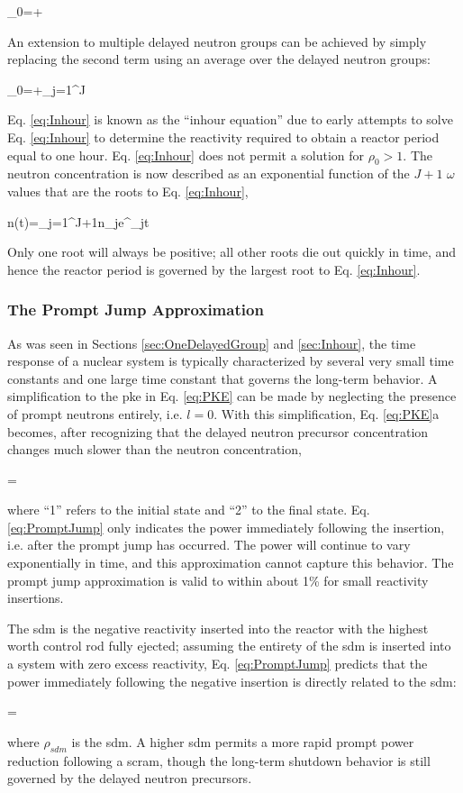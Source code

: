 \beq
\rho_0=+
\eeq

An extension to multiple delayed neutron groups can be achieved by simply replacing the second term using an average over the delayed neutron groups:

\beq
\label{eq:Inhour}
\rho_0=+\sum_{j=1}^J
\eeq

Eq. \eqref{eq:Inhour} is known as the ``inhour equation'' due to early attempts to solve Eq. \eqref{eq:Inhour} to determine the reactivity required to obtain a reactor period equal to one hour. Eq. \eqref{eq:Inhour} does not permit a solution for \(\rho_0>1\). The neutron concentration is now described as an exponential function of the \(J+1\) \(\omega\) values that are the roots to Eq. \eqref{eq:Inhour},

\beq
n(t)=\sum_{j=1}^{J+1}n_je^{\omega_jt}
\eeq

Only one root will always be positive; all other roots die out quickly in time, and hence the reactor period is governed by the largest root to Eq. \eqref{eq:Inhour}.

\subsubsection{The Prompt Jump Approximation}

As was seen in Sections \ref{sec:OneDelayedGroup} and \ref{sec:Inhour}, the time response of a nuclear system is typically characterized by several very small time constants and one large time constant that governs the long-term behavior. A simplification to the \gls{pke} in Eq. \eqref{eq:PKE} can be made by neglecting the presence of prompt neutrons entirely, i.e. \(l=0\). With this simplification, Eq. \eqref{eq:PKE}a becomes, after recognizing that the delayed neutron precursor concentration changes much slower than the neutron concentration,

\beq
\label{eq:PromptJump}
=
\eeq

where ``1'' refers to the initial state and ``2'' to the final state. Eq. \eqref{eq:PromptJump} only indicates the power immediately following the insertion, i.e. after the prompt jump has occurred. The power will continue to vary exponentially in time, and this approximation cannot capture this behavior. The prompt jump approximation is valid to within about 1\% for small reactivity insertions.

The \gls{sdm} is the negative reactivity inserted into the reactor with the highest worth control rod fully ejected; assuming the entirety of the \gls{sdm} is inserted into a system with zero excess reactivity, Eq. \eqref{eq:PromptJump} predicts that the power immediately following the negative insertion is directly related to the \gls{sdm}:

\beq
{}=
\eeq

where \(\rho_{sdm}\) is the \gls{sdm}. A higher \gls{sdm} permits a more rapid prompt power reduction following a scram, though the long-term shutdown behavior is still governed by the delayed neutron precursors.